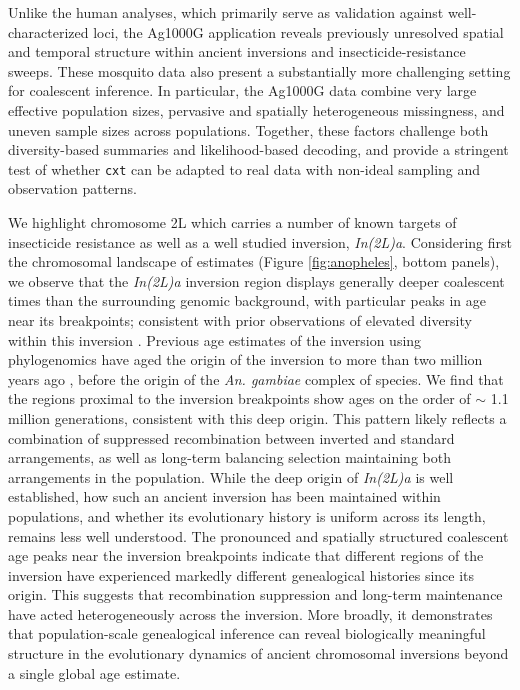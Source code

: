 \documentclass{article}
\newcommand{\cxtkit}{\texttt{cxt}\xspace}
\let\citep\parencite
\begin{document}
Unlike the human analyses, which primarily serve as validation against well-characterized loci, 
the Ag1000G application reveals previously unresolved spatial and temporal structure within ancient inversions and insecticide-resistance sweeps.
These mosquito data also present a substantially more challenging setting for coalescent inference.
In particular,
the Ag1000G data combine very large effective population sizes,
pervasive and spatially heterogeneous missingness,
and uneven sample sizes across populations.
Together,
these factors challenge both diversity-based summaries and likelihood-based decoding,
and provide a stringent test of whether \cxtkit can be adapted to real data 
with non-ideal sampling and observation patterns.

We highlight chromosome 2L which carries a number of known targets
of insecticide resistance as well as a well studied inversion, \emph{In(2L)a}. 
Considering first the chromosomal landscape of estimates (Figure \ref{fig:anopheles},
bottom panels), we observe that the \emph{In(2L)a} inversion region displays generally deeper coalescent times
than the surrounding genomic background, with particular peaks in age near its breakpoints;
consistent with prior observations of elevated diversity within this inversion \citep{love2016chromosomal}. 
Previous age estimates of the inversion using phylogenomics have aged the origin of the
inversion to more than two million years ago \citep{fontaine2015extensive},
before the origin of the \emph{An. gambiae} complex of species.
We find that the regions proximal to the inversion breakpoints show ages on the order of $\sim$ 1.1 million generations, consistent with this deep origin.
This pattern likely reflects a combination of suppressed recombination between inverted and standard arrangements, 
as well as long-term balancing selection maintaining both arrangements in the population.
While the deep origin of \emph{In(2L)a} is well established, how such an ancient inversion has been maintained within populations, and whether its evolutionary history is uniform across its length, remains less well understood. The pronounced and spatially structured coalescent age peaks near the inversion breakpoints indicate that different regions of the inversion have experienced markedly different genealogical histories since its origin. 
This suggests that recombination suppression and long-term maintenance have acted heterogeneously across the inversion.
More broadly, it demonstrates that population-scale genealogical inference can reveal biologically meaningful structure in the evolutionary dynamics of ancient chromosomal inversions beyond a single global age estimate.
\end{document}
